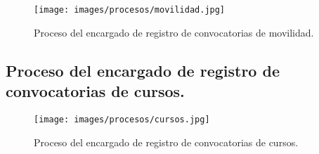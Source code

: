 \begin{figure}[h!]
	\begin{center}
		\texttt{[image: images/procesos/movilidad.jpg]}
		\caption{Proceso del encargado de registro de convocatorias de movilidad.}
		\label{fig:movilidad}
	\end{center}
\end{figure}

\subsection{Proceso del encargado de registro de convocatorias de cursos.}

\begin{figure}[h!]
	\begin{center}
		\texttt{[image: images/procesos/cursos.jpg]}
		\caption{Proceso del encargado de registro de convocatorias de cursos.}
		\label{fig:cursos}
	\end{center}
\end{figure}